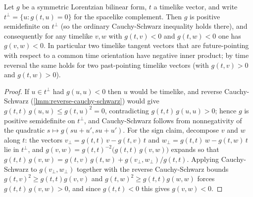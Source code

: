 \begin{lemma}
    \label{lmm:cone-sign-lemma}
    \leanok
    Let $g$ be a symmetric Lorentzian bilinear form, $t$ a timelike vector, and write $t^\perp = \{u : g(t,u) = 0\}$ for the spacelike complement. Then $g$ is positive semidefinite on $t^\perp$ (so the ordinary Cauchy-Schwarz inequality holds there), and consequently for any timelike $v, w$ with $g(t,v) < 0$ and $g(t,w) < 0$ one has $g(v,w) < 0$. In particular two timelike tangent vectors that are future-pointing with respect to a common time orientation have negative inner product; by time reversal the same holds for two past-pointing timelike vectors (with $g(t,v) > 0$ and $g(t,w) > 0$).
\end{lemma}
\begin{proof}
    \leanok
    If $u \in t^\perp$ had $g(u,u) < 0$ then $u$ would be timelike, and reverse Cauchy-Schwarz (\ref{lmm:reverse-cauchy-schwarz}) would give $g(t,t)\,g(u,u) \le g(t,u)^2 = 0$, contradicting $g(t,t)\,g(u,u) > 0$; hence $g$ is positive semidefinite on $t^\perp$, and Cauchy-Schwarz follows from nonnegativity of the quadratic $s \mapsto g(s u + u', s u + u')$. For the sign claim, decompose $v$ and $w$ along $t$: the vectors $v_\perp = g(t,t)\,v - g(t,v)\,t$ and $w_\perp = g(t,t)\,w - g(t,w)\,t$ lie in $t^\perp$, and $g(v,w) = g(t,t)^{-2}\big(g(t,t)\,g(v,w)\big)$ expands so that $g(t,t)\,g(v,w) = g(t,v)\,g(t,w) + g(v_\perp, w_\perp)/g(t,t)$. Applying Cauchy-Schwarz to $g(v_\perp,w_\perp)$ together with the reverse Cauchy-Schwarz bounds $g(t,v)^2 \ge g(t,t)g(v,v)$ and $g(t,w)^2 \ge g(t,t)g(w,w)$ forces $g(t,t)\,g(v,w) > 0$, and since $g(t,t) < 0$ this gives $g(v,w) < 0$.
\end{proof}

